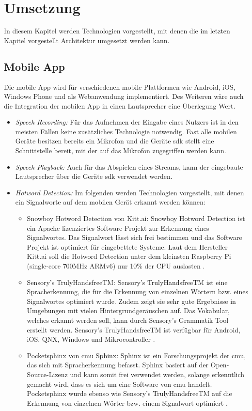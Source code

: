 \section{Umsetzung}
In diesem Kapitel werden Technologien vorgestellt, mit denen die im letzten Kapitel vorgestellt Architektur umgesetzt werden kann. 

\subsection{Mobile App}
Die mobile App wird für verschiedenen mobile Plattformen wie Android, iOS, Windows Phone und als Webanwendung implementiert. Des Weiteren wäre auch die Integration der mobilen App in einen Lautsprecher eine Überlegung Wert. 
\begin{itemize}
	\item \textsl{Speech Recording:} Für das Aufnehmen der Eingabe eines Nutzers ist in den meisten Fällen keine zusätzliches Technologie notwendig. Fast alle mobilen Geräte besitzen bereits ein Mikrofon und die Geräte \acs{sdk} stellt eine Schnittstelle bereit, mit der auf das Mikrofon zugegriffen werden kann.
	\item \textsl{Speech Playback:} Auch für das Abspielen eines Streams, kann der eingebaute Lautsprecher über die Geräte \acs{sdk} verwendet werden.
	\item \textsl{Hotword Detection:} Im folgenden werden Technologien vorgestellt, mit denen ein Signalworte auf dem mobilen Gerät erkannt werden können: 
	\begin{itemize}
		\item Snowboy Hotword Detection von Kitt.ai: Snowboy Hotword Detection ist ein Apache lizenziertes Software Projekt zur Erkennung eines Signalwortes. Das Signalwort lässt sich frei bestimmen und das Software Projekt ist optimiert für eingebettete Systeme. Laut dem Hersteller Kitt.ai soll die Hotword Detection unter dem kleinsten Raspberry Pi (single-core 700MHz ARMv6) nur 10\% der CPU
		auslasten \cite{SnowboyHotwordDetection}.
		\item Sensory's TrulyHandsfreeTM: Sensory's TrulyHandsfreeTM ist eine Spracherkennung, die für die Erkennung von einzelnen Wörtern bzw. eines Signalwortes optimiert wurde. Zudem zeigt sie sehr gute Ergebnisse in Umgebungen mit vielen Hintergrundgeräuschen auf. Das Vokabular, welches erkannt werden soll, kann durch Sensory's Grammatik Tool erstellt werden. Sensory's TrulyHandsfreeTM ist verfügbar für Android, iOS, QNX, Windows und Mikrocontroller \cite{TrulyHandsfreeTM}.
		\item Pocketsphinx von \acs{cmu} Sphinx: Sphinx ist ein Forschungsprojekt der \ac{cmu}, das sich mit Spracherkennung befasst. Sphinx basiert auf der Open-Source-Lizenz und kann somit frei verwendet werden, solange erkenntlich gemacht wird, dass es sich um eine Software von \ac{cmu} handelt. Pocketsphinx wurde ebenso wie Sensory's TrulyHandsfreeTM auf die Erkennung von einzelnen Wörter bzw. einem Signalwort optimiert \cite{Pocketsphinx}.
	\end{itemize}
\end{itemize}

